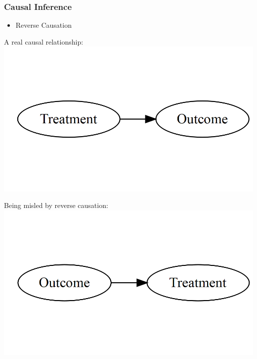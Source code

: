 \documentclass[xcolor=x11names,compress]{beamer}\usepackage[]{graphicx}\usepackage[]{color}
\makeatletter
\def\maxwidth{ %
  \ifdim\Gin@nat@width>\linewidth
    \linewidth
  \else
    \Gin@nat@width
  \fi
}
\newenvironment{knitrout}{}{} %
\renewcommand{\(}{\begin{columns}}
\renewcommand{\)}{\end{columns}}
\newcommand{\<}[1]{\begin{column}{#1}}
\renewcommand{\>}{\end{column}}
\makeatother
\begin{document}
\begin{frame}
\frametitle{Causal Inference}
\begin{itemize}
\item Reverse Causation
\end{itemize}
\begin{multicols}{2}
A real causal relationship:
\begin{knitrout}
\color{fgcolor}
\includegraphics[width=\maxwidth]{figure/explanation5-1} 

\end{knitrout}
\columnbreak
Being misled by reverse causation:
\begin{knitrout}
\color{fgcolor}
\includegraphics[width=\maxwidth]{figure/explanation6-1} 

\end{knitrout}
\end{multicols}
\end{frame}
\end{document}
